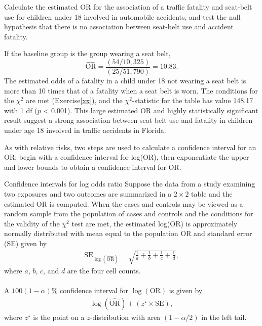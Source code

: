 
\begin{examplewrap}
  \begin{nexample}{Calculate the estimated OR for the association of a traffic fatality and seat-belt use for children under 18 involved in automobile accidents, and test the null hypothesis that there is no association between seat-belt use and accident fatality.} \label{seatbeltUseFatalityChildren}

    If the baseline group is the group wearing a seat belt,
 \[
      \widehat{\text{OR}} = \dfrac{(54/10,325)}{(25/51,790)} = 10.83.
 \]
 The estimated odds of a fatality in a child under 18 not wearing a seat belt is more than 10 times that of a fatality when a seat belt is worn.  The conditions for the $\chi^2$ are met (Exercise\ref{xx}), and the $\chi^2$-statistic for the table has value 148.17 with 1 df ($p$ < 0.001).  This large estimated OR and highly statistically significant result suggest a strong association between seat belt use and fatality in children under age 18 involved in traffic accidents in Florida.
  \end{nexample}
\end{examplewrap}

As with relative risks, two steps are used to calculate a confidence interval for an OR: begin with a confidence interval for log(OR), then exponentiate the upper and lower bounds to obtain a confidence interval for OR.

\begin{onebox}{Confidence intervals for log odds ratio}
  Suppose the data from a study examining two exposures and two outcomes are summarized in a $2 \times 2$ table and the estimated OR is computed. When the cases and controls may be viewed as a random sample from the population of cases and controls and the conditions for the validity of the $\chi^2$ test are met, the estimated log(OR) is approximately normally distributed with mean equal to the population OR and standard error (SE) given by
  \begin{align*}
    \text{SE}_{\log(\widehat{\text{OR}})} = \sqrt{\frac{1}{a} + \frac{1}{b} 
   + \frac{1}{c} + \frac{1}{d}},
  \end{align*}
  where $a$, $b$, $c$, and $d$ are the four cell counts. \\
  \\
   A $100(1  - \alpha)\%$ confidence interval for $\log(\text{OR})$ is given by
\begin{align}
  \log(\widehat{\text{OR}}) \pm (z^{\star} \times \text{SE}),
  \label{eqn:confidenceIntervalOR}
\end{align}  
where $z^{\star}$ is the point on a $z$-distribution with area $(1 - \alpha/2)$ in the left tail.
\end{onebox}

